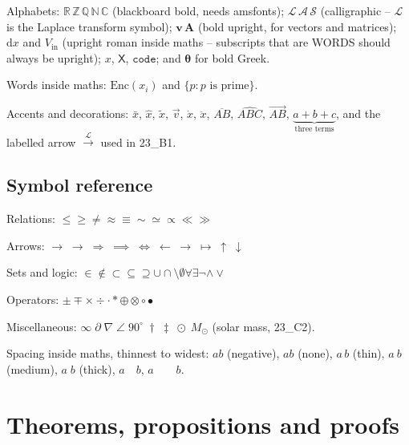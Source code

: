 \documentclass[11pt,a4paper]{article}
\theoremstyle{definition}                   %
\begin{document}
Alphabets: $\mathbb{R}\,\mathbb{Z}\,\mathbb{Q}\,\mathbb{N}\,\mathbb{C}$
(blackboard bold, needs amsfonts);
$\mathcal{L}\,\mathcal{A}\,\mathcal{S}$ (calligraphic --
$\mathcal{L}$ is the Laplace transform symbol);
$\mathbf{v}\,\mathbf{A}$ (bold upright, for vectors and matrices);
$\mathrm{d}x$ and $V_{\mathrm{in}}$ (upright roman inside maths --
subscripts that are WORDS should always be upright);
$\mathit{x}$, $\mathsf{X}$, $\mathtt{code}$;
and $\boldsymbol{\theta}$ for bold Greek.

Words inside maths: $\text{Enc}(x_i)$ and $\{p : p \text{ is prime}\}$.

Accents and decorations:
$\bar{x}$, $\hat{x}$, $\tilde{x}$, $\vec{v}$, $\dot{x}$, $\ddot{x}$,
$\overline{AB}$, $\widehat{ABC}$, $\overrightarrow{AB}$,
$\underbrace{a+b+c}_{\text{three terms}}$, and the labelled arrow
$\xrightarrow{\mathcal{L}}$ used in 23\_B1.

\subsection{Symbol reference}

Relations:
$\leq \geq \neq \approx \equiv \sim \simeq \propto \ll \gg$

Arrows:
$\to \; \rightarrow \; \Rightarrow \; \implies \; \iff \; \leftarrow \;
\longrightarrow \; \mapsto \; \uparrow \; \downarrow$

Sets and logic:
$\in \notin \subset \subseteq \supseteq \cup \cap \setminus \emptyset
\forall \exists \neg \land \lor$

Operators:
$\pm \mp \times \div \cdot \ast \oplus \otimes \circ \bullet$

Miscellaneous:
$\infty \; \partial \; \nabla \; \angle \; 90^\circ \; \dagger \; \ddagger \;
\odot \; M_{\odot}$ (solar mass, 23\_C2).

Spacing inside maths, thinnest to widest:
$a\!b$ (negative), $ab$ (none), $a\,b$ (thin), $a\:b$ (medium),
$a\;b$ (thick), $a\quad b$, $a\qquad b$.


\section{Theorems, propositions and proofs}
\end{document}
